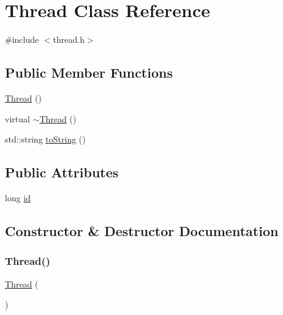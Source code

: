 \hypertarget{classThread}{}\section{Thread Class Reference}
\label{classThread}


{\ttfamily \#include $<$thread.\+h$>$}

\subsection*{Public Member Functions}
\begin{DoxyCompactItemize}
\item 
\mbox{\hyperlink{classThread_a7542b81caf3dbfcbd2b2f217fd10c240}{Thread}} ()
\item 
virtual \mbox{\hyperlink{classThread_a87a9c69a69ee4b13cb1ec5772f6d32ad}{$\sim$\+Thread}} ()
\item 
std\+::string \mbox{\hyperlink{classThread_abcb3be8f01217ad05e590b45da6fc827}{to\+String}} ()
\end{DoxyCompactItemize}
\subsection*{Public Attributes}
\begin{DoxyCompactItemize}
\item 
long \mbox{\hyperlink{classThread_a7350fbd6ad10618f3b750b1f99ca5c3c}{id}}
\end{DoxyCompactItemize}


\subsection{Constructor \& Destructor Documentation}
\mbox{\label{classThread_a7542b81caf3dbfcbd2b2f217fd10c240}} 
\subsubsection{\texorpdfstring{Thread()}{Thread()}}
{\footnotesize\ttfamily \mbox{\hyperlink{classThread}{Thread}} (\begin{DoxyParamCaption}{ }\end{DoxyParamCaption})}

\mbox{\label{classThread_a87a9c69a69ee4b13cb1ec5772f6d32ad}} 
